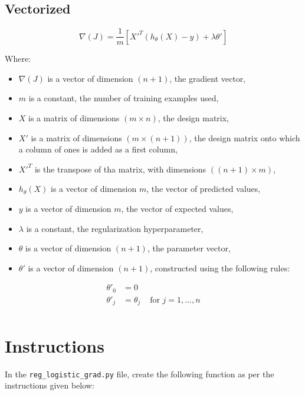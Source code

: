 \subsection*{Vectorized}
$$
\nabla(J) = \frac{1}{m} [X'^T(h_\theta(X) - y) + \lambda \theta']
$$  

Where:
\begin{itemize}
  \item $\nabla(J)$ is a vector of dimension $(n + 1)$, the gradient vector,
  \item $m$ is a constant, the number of training examples used,
  \item $X$ is a matrix of dimensions $(m \times n)$, the design matrix,
  \item $X'$ is a matrix of dimensions $(m \times (n + 1))$, the design matrix onto which a column of ones is added as a first column,
  \item $X'^T$ is the transpose of tha matrix, with dimensions $((n + 1) \times m)$,
  \item $h_\theta(X)$ is a vector of dimension $m$, the vector of predicted values, 
  \item $y$ is a vector of dimension $m$, the vector of expected values,
  \item $\lambda$ is a constant, the regularization hyperparameter,
  \item $\theta$ is a vector of dimension $(n + 1)$, the parameter vector,
  \item $\theta'$ is a vector of dimension $(n + 1)$, constructed using the following rules: 
\end{itemize}

$$
\begin{matrix}
\theta'_0 & =  0 \\
\theta'_j & =  \theta_j & \text{ for } j = 1, \dots, n\\
\end{matrix}
$$

\section*{Instructions}
In the \texttt{reg\_logistic\_grad.py} file, create the following function as per the instructions given below:

